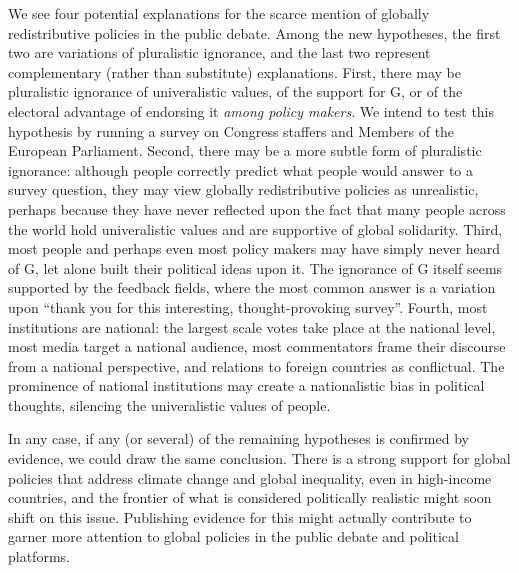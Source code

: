 \documentclass{nature}
\begin{document}
We see four potential explanations for the scarce mention of globally redistributive policies in the public debate. Among the new hypotheses, the first two are variations of pluralistic ignorance, and the last two represent complementary (rather than substitute) explanations. First, there may be pluralistic ignorance of univeralistic values, of the support for G, or of the electoral advantage of endorsing it \textit{among policy makers}. We intend to test this hypothesis by running a survey on Congress staffers and Members of the European Parliament. Second, there may be a more subtle form of pluralistic ignorance: although people correctly predict what people would answer to a survey question, they may view globally redistributive policies as unrealistic, perhaps because they have never reflected upon the fact that many people across the world hold univeralistic values and are supportive of global solidarity. Third, most people and perhaps even most policy makers may have simply never heard of G, let alone built their political ideas upon it. The ignorance of G itself seems supported by the feedback fields, where the most common answer is a variation upon ``thank you for this interesting, thought-provoking survey''. Fourth, most institutions are national: the largest scale votes take place at the national level, most media target a national audience, most commentators frame their discourse from a national perspective, and relations to foreign countries as conflictual. The prominence of national institutions may create a nationalistic bias in political thoughts, silencing the univeralistic values of people. %

In any case, if any (or several) of the remaining hypotheses is confirmed by evidence, we could draw the same conclusion. There is a strong support for global policies that address climate change and global inequality, even in high-income countries, and the frontier of what is considered politically realistic might soon shift on this issue. Publishing evidence for this might actually contribute to garner more attention to global policies in the public debate and political platforms.
\end{document}

